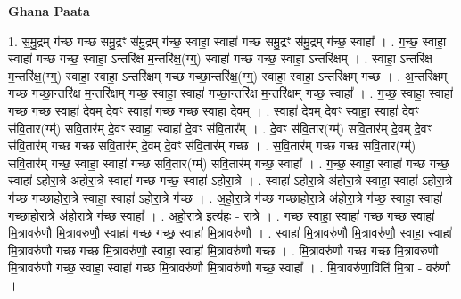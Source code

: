 \documentclass[17pt]{extarticle}
\begin{document}
\textbf{Ghana Paata } \newline

1. स॒मु॒द्रम् ग॑च्छ गच्छ समु॒द्रꣳ स॑मु॒द्रम् ग॑च्छ॒ स्वाहा॒ स्वाहा॑ गच्छ समु॒द्रꣳ स॑मु॒द्रम् ग॑च्छ॒ स्वाहा᳚ । . ग॒च्छ॒ स्वाहा॒ स्वाहा॑ गच्छ गच्छ॒ स्वाहा॒ ऽन्तरि॑क्ष म॒न्तरि॑क्ष॒(ग्ग्॒) स्वाहा॑ गच्छ गच्छ॒ स्वाहा॒ ऽन्तरि॑क्षम् । . स्वाहा॒ ऽन्तरि॑क्ष म॒न्तरि॑क्ष॒(ग्ग्॒) स्वाहा॒ स्वाहा॒ ऽन्तरि॑क्षम् गच्छ गच्छा॒न्तरि॑क्ष॒(ग्ग्॒) स्वाहा॒ स्वाहा॒ ऽन्तरि॑क्षम् गच्छ । . अ॒न्तरि॑क्षम् गच्छ गच्छा॒न्तरि॑क्ष म॒न्तरि॑क्षम् गच्छ॒ स्वाहा॒ स्वाहा॑ गच्छा॒न्तरि॑क्ष म॒न्तरि॑क्षम् गच्छ॒ स्वाहा᳚ । . ग॒च्छ॒ स्वाहा॒ स्वाहा॑ गच्छ गच्छ॒ स्वाहा॑ दे॒वम् दे॒वꣳ स्वाहा॑ गच्छ गच्छ॒ स्वाहा॑ दे॒वम् । . स्वाहा॑ दे॒वम् दे॒वꣳ स्वाहा॒ स्वाहा॑ दे॒वꣳ स॑वि॒तार(ग्म्॑) सवि॒तार॑म् दे॒वꣳ स्वाहा॒ स्वाहा॑ दे॒वꣳ स॑वि॒तार᳚म् । . दे॒वꣳ स॑वि॒तार(ग्म्॑) सवि॒तार॑म् दे॒वम् दे॒वꣳ स॑वि॒तार॑म् गच्छ गच्छ सवि॒तार॑म् दे॒वम् दे॒वꣳ स॑वि॒तार॑म् गच्छ । . स॒वि॒तार॑म् गच्छ गच्छ सवि॒तार(ग्म्॑) सवि॒तार॑म् गच्छ॒ स्वाहा॒ स्वाहा॑ गच्छ सवि॒तार(ग्म्॑) सवि॒तार॑म् गच्छ॒ स्वाहा᳚ । . ग॒च्छ॒ स्वाहा॒ स्वाहा॑ गच्छ गच्छ॒ स्वाहा॑ ऽहोरा॒त्रे अ॑होरा॒त्रे स्वाहा॑ गच्छ गच्छ॒ स्वाहा॑ ऽहोरा॒त्रे । . स्वाहा॑ ऽहोरा॒त्रे अ॑होरा॒त्रे स्वाहा॒ स्वाहा॑ ऽहोरा॒त्रे ग॑च्छ गच्छाहोरा॒त्रे स्वाहा॒ स्वाहा॑ ऽहोरा॒त्रे ग॑च्छ । . अ॒हो॒रा॒त्रे ग॑च्छ गच्छाहोरा॒त्रे अ॑होरा॒त्रे ग॑च्छ॒ स्वाहा॒ स्वाहा॑ गच्छाहोरा॒त्रे अ॑होरा॒त्रे ग॑च्छ॒ स्वाहा᳚ । . अ॒हो॒रा॒त्रे इत्य॑हः - रा॒त्रे । . ग॒च्छ॒ स्वाहा॒ स्वाहा॑ गच्छ गच्छ॒ स्वाहा॑ मि॒त्रावरु॑णौ मि॒त्रावरु॑णौ॒ स्वाहा॑ गच्छ गच्छ॒ स्वाहा॑ मि॒त्रावरु॑णौ । . स्वाहा॑ मि॒त्रावरु॑णौ मि॒त्रावरु॑णौ॒ स्वाहा॒ स्वाहा॑ मि॒त्रावरु॑णौ गच्छ गच्छ मि॒त्रावरु॑णौ॒ स्वाहा॒ स्वाहा॑ मि॒त्रावरु॑णौ गच्छ । . मि॒त्रावरु॑णौ गच्छ गच्छ मि॒त्रावरु॑णौ मि॒त्रावरु॑णौ गच्छ॒ स्वाहा॒ स्वाहा॑ गच्छ मि॒त्रावरु॑णौ मि॒त्रावरु॑णौ गच्छ॒ स्वाहा᳚ । . मि॒त्रावरु॑णा॒विति॑ मि॒त्रा - वरु॑णौ । \newline
\end{document}
